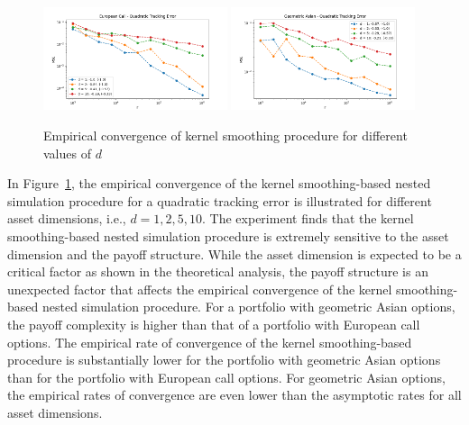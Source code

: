 \begin{figure}[ht!]
    \centering
    \includegraphics[width=0.48\textwidth]{./project1/figures/figure4a.png}
    \includegraphics[width=0.48\textwidth]{./project1/figures/figure4b.png}
    \caption{Empirical convergence of kernel smoothing procedure for different values of $d$}
    \label{fig1:kernel_d} 
\end{figure}

In Figure~\ref{fig1:kernel_d}, the empirical convergence of the kernel smoothing-based nested simulation procedure for a quadratic tracking error is illustrated for different asset dimensions, i.e., $d = 1, 2, 5, 10$.
The experiment finds that the kernel smoothing-based nested simulation procedure is extremely sensitive to the asset dimension and the payoff structure.
While the asset dimension is expected to be a critical factor as shown in the theoretical analysis, the payoff structure is an unexpected factor that affects the empirical convergence of the kernel smoothing-based nested simulation procedure.
For a portfolio with geometric Asian options, the payoff complexity is higher than that of a portfolio with European call options.
The empirical rate of convergence of the kernel smoothing-based procedure is substantially lower for the portfolio with geometric Asian options than for the portfolio with European call options.
For geometric Asian options, the empirical rates of convergence are even lower than the asymptotic rates for all asset dimensions.

